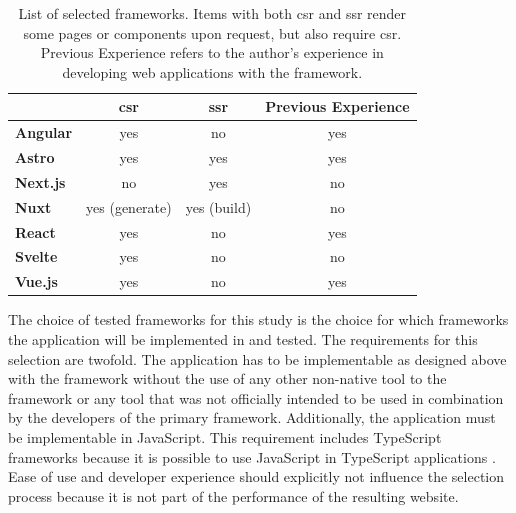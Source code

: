 \documentclass[a4paper, 12pt]{article}
\begin{document}
\begin{table}[b]
  \begin{center}
    \begin{tabular}[h]{|l|c|c|c|}
      \hline
      ~                 & \textbf{\acrshort{csr}} & \textbf{\acrshort{ssr}} & \textbf{Previous Experience}  \\ \hline
      \textbf{Angular}  & yes                     & no                      & yes                           \\ \hline
      \textbf{Astro}    & yes                     & yes                     & yes                           \\ \hline
      \textbf{Next.js}  & no                      & yes                     & no                            \\ \hline
      \textbf{Nuxt}     & yes (generate)          & yes (build)             & no                            \\ \hline
      \textbf{React}    & yes                     & no                      & yes                           \\ \hline
      \textbf{Svelte}   & yes                     & no                      & no                            \\ \hline
      \textbf{Vue.js}   & yes                     & no                      & yes                           \\ \hline
    \end{tabular}
  \end{center}
  \caption{List of selected frameworks. Items with both \acrfull{csr} and \acrfull{ssr} render some pages or components upon request, but also require \acrfull{csr}. Previous Experience refers to the author's experience in developing web applications with the framework.}
  \label{tab:frameworks}
\end{table}

The choice of tested frameworks for this study is the choice for which frameworks the application will be implemented in and tested.
The requirements for this selection are twofold.
The application has to be implementable as designed above with the framework without the use of any other non-native tool to the framework or any tool that was not officially intended to be used in combination by the developers of the primary framework.
Additionally, the application must be implementable in JavaScript.
This requirement includes TypeScript frameworks because it is possible to use JavaScript in TypeScript applications \citep{typescript}.
Ease of use and developer experience should explicitly not influence the selection process because it is not part of the performance of the resulting website.
\end{document}
